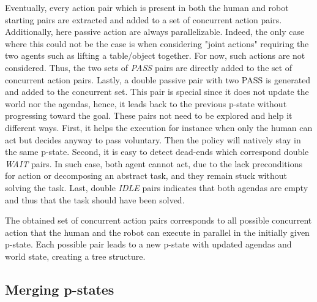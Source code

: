 Eventually, every action pair which is present in both the human and robot starting pairs are extracted and added to a set of concurrent action pairs. 
Additionally, here passive action are always parallelizable. Indeed, the only case where this could not be the case is when considering "joint actions" requiring the two agents such as lifting a table/object together. For now, such actions are not considered. Thus, the two sets of \textit{PASS} pairs are directly added to the set of concurrent action pairs. 
Lastly, a double passive pair with two PASS is generated and added to the concurrent set. This pair is special since it does not update the world nor the agendas, hence, it leads back to the previous p-state without progressing toward the goal. These pairs not need to be explored and help it different ways. First, it helps the execution for instance when only the human can act but decides anyway to pass voluntary. Then the policy will natively stay in the same p-state. Second, it is easy to detect dead-ends which correspond double \textit{WAIT} pairs. In such case, both agent cannot act, due to the lack preconditions for action or decomposing an abstract task, and they remain stuck without solving the task.  
Last, double \textit{IDLE} pairs indicates that both agendas are empty and thus that the task should have been solved. 

The obtained set of concurrent action pairs corresponds to all possible concurrent action that the human and the robot can execute in parallel in the initially given p-state. Each possible pair leads to a new p-state with updated agendas and world state, creating a tree structure. 

    \subsection{Merging p-states}

